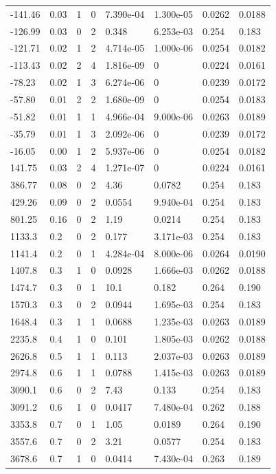 \documentclass[preview]{standalone}
\begin{document}
{{\begin{tabular}{L{1.2cm}C{1.2cm} C{0.3cm}C{0.5cm} C{1.4cm}C{1.4cm} C{1.4cm}C{1.4cm}}
  -141.46  &  0.03  & 1     &  0 &  7.390e-04  & 1.300e-05  & 0.0262 &  0.0188   \\ 
  -126.99  &  0.03  & 0     &  2 &  0.348  & 6.253e-03  & 0.254 &  0.183   \\ 
  -121.71  &  0.02  & 1     &  2 &  4.714e-05  & 1.000e-06  & 0.0254 &  0.0182   \\ 
  -113.43  &  0.02  & 2     &  4 &  1.816e-09  & 0  & 0.0224 &  0.0161   \\ 
  -78.23  &  0.02  & 1     &  3 &  6.274e-06  & 0  & 0.0239 &  0.0172   \\ 
  -57.80  &  0.01  & 2     &  2 &  1.680e-09  & 0  & 0.0254 &  0.0183   \\ 
  -51.82  &  0.01  & 1     &  1 &  4.966e-04  & 9.000e-06  & 0.0263 &  0.0189   \\ 
  -35.79  &  0.01  & 1     &  3 &  2.092e-06  & 0  & 0.0239 &  0.0172   \\ 
  -16.05  &  0.00  & 1     &  2 &  5.937e-06  & 0  & 0.0254 &  0.0182   \\ 
  141.75  &  0.03  & 2     &  4 &  1.271e-07  & 0  & 0.0224 &  0.0161   \\ 
  386.77  &  0.08  & 0     &  2 &  4.36  & 0.0782  & 0.254 &  0.183   \\ 
  429.26  &  0.09  & 0     &  2 &  0.0554  & 9.940e-04  & 0.254 &  0.183   \\ 
  801.25  &  0.16  & 0     &  2 &  1.19  & 0.0214  & 0.254 &  0.183   \\ 
  1133.3  &   0.2  & 0     &  2 &  0.177  & 3.171e-03  & 0.254 &  0.183   \\ 
  1141.4  &   0.2  & 0     &  1 &  4.284e-04  & 8.000e-06  & 0.0264 &  0.0190   \\ 
  1407.8  &   0.3  & 1     &  0 &  0.0928  & 1.666e-03  & 0.0262 &  0.0188   \\ 
  1474.7  &   0.3  & 0     &  1 &  10.1  & 0.182  & 0.264 &  0.190   \\ 
  1570.3  &   0.3  & 0     &  2 &  0.0944  & 1.695e-03  & 0.254 &  0.183   \\ 
  1648.4  &   0.3  & 1     &  1 &  0.0688  & 1.235e-03  & 0.0263 &  0.0189   \\ 
  2235.8  &   0.4  & 1     &  0 &  0.101  & 1.805e-03  & 0.0262 &  0.0188   \\ 
  2626.8  &   0.5  & 1     &  1 &  0.113  & 2.037e-03  & 0.0263 &  0.0189   \\ 
  2974.8  &   0.6  & 1     &  1 &  0.0788  & 1.415e-03  & 0.0263 &  0.0189   \\ 
  3090.1  &   0.6  & 0     &  2 &  7.43  & 0.133  & 0.254 &  0.183   \\ 
  3091.2  &   0.6  & 1     &  0 &  0.0417  & 7.480e-04  & 0.262 &  0.188   \\ 
  3353.8  &   0.7  & 0     &  1 &  1.05  & 0.0189  & 0.264 &  0.190   \\ 
  3557.6  &   0.7  & 0     &  2 &  3.21  & 0.0577  & 0.254 &  0.183   \\ 
  3678.6  &   0.7  & 1     &  0 &  0.0414  & 7.430e-04  & 0.263 &  0.189   \\ 
\hline 
\end{tabular} 

}}
\end{document}
